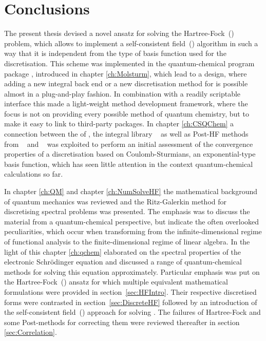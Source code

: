\chapter{Conclusions}
\label{ch:Conclusion}



\noindent
The present thesis devised a novel ansatz for solving the Hartree-Fock~(\HF) problem,
which allows to implement a self-consistent field~(\SCF) algorithm
in such a way that it is independent from the type
of basis function used for the discretisation.
This scheme was implemented in the quantum-chemical program package \molsturm,
introduced in chapter \ref{ch:Molsturm},
which lead to a design,
where adding a new integral back end or a new discretisation method for \HF
is possible almost in a plug-and-play fashion.
In combination with a readily scriptable \python interface
this made \molsturm a light-weight method development framework,
where the focus is not on providing every possible method
of quantum chemistry,
but to make it easy to link to third-party packages.
In chapter \ref{ch:CSQChem} a connection between the \SCF of \molsturm,
the integral library \sturmint~\cite{sturmintWeb} as well as
Post-HF methods from \pyscf~\cite{Sun2017} and \adcman~\cite{Wormit2014}
was exploited to perform an initial assessment
of the convergence properties of a discretisation based on Coulomb-Sturmians,
an exponential-type basis function,
which has seen little attention in the context quantum-chemical calculations so far.

In chapter \vref{ch:QM} and chapter \vref{ch:NumSolveHF}
the mathematical background of quantum mechanics was reviewed
and the Ritz-Galerkin method for discretising
spectral problems was presented.
The emphasis was to discuss the material from a quantum-chemical perspective,
but indicate the often overlooked peculiarities,
which occur when transforming from the infinite-dimensional regime
of functional analysis to the finite-dimensional regime of linear algebra.
In the light of this chapter \vref{ch:qchem} elaborated on the
spectral properties of the electronic Schrödinger equation
and discussed a range of quantum-chemical methods
for solving this equation approximately.
Particular emphasis was put on the Hartree-Fock~(\HF)
ansatz for which multiple equivalent mathematical formulations
were provided in section~\vref{sec:HFIntro}.
Their respective discretised forms
were contrasted in section~\vref{sec:DiscreteHF}
followed by an introduction of the self-consistent field~(\SCF) approach
for solving \HF.
The failures of Hartree-Fock and some Post-\HF methods
for correcting them were reviewed thereafter in section \vref{sec:Correlation}.

